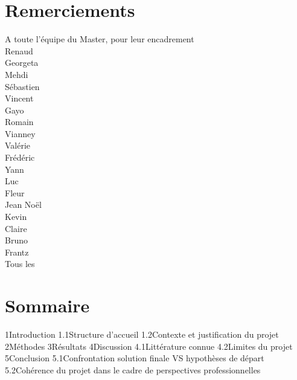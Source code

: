 \documentclass[a4paper, 11pt, openany, oneside, abstract=on]{report}
\begin{document}
\part*{Remerciements}
A toute l'équipe du Master, pour leur encadrement \\
Renaud \\
Georgeta \\
Mehdi \\
Sébastien \\
Vincent \\
Gayo \\
Romain \\
Vianney \\
Valérie \\
Frédéric \\
Yann \\
Luc \\
Fleur \\
Jean Noël \\
Kevin \\
Claire \\
Bruno \\
Frantz \\
Tous les \\

\part*{Sommaire}
1Introduction
1.1Structure d'accueil
1.2Contexte et justification du projet
2Méthodes
3Résultats
4Discussion
4.1Littérature connue
4.2Limites du projet
5Conclusion
5.1Confrontation solution finale VS hypothèses de départ
5.2Cohérence du projet dans le cadre de perspectives professionnelles
\end{document}
